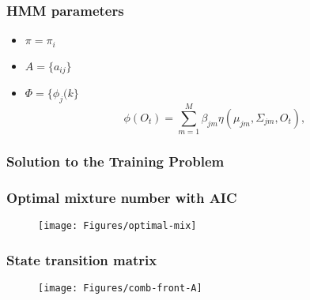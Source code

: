 \documentclass[serif,mathserif]{beamer}
\begin{document}
\begin{frame}
	\frametitle{HMM parameters}
	\begin{itemize}
		\item \(\pi = {\pi_i}\) \pause 	 %
		\newline
		\newline
		\item \(A =  \{a_{ij} \}\) \pause%
		\newline
		\newline
		\item \(\Phi =   \{ \phi_{j}(k\}\) \pause%
		\begin{equation*}
		\phi(O_t) = \sum_{m=1}^M \beta_{jm} \eta(\mu_{jm}, \Sigma_{jm}, O_t), \label{eq:phi}
		\end{equation*}
	\end{itemize}
\end{frame}

\begin{frame}
	\frametitle{Solution to the Training Problem}
	
\end{frame}

\begin{frame}
	\frametitle{Optimal mixture number with AIC}
	\begin{figure}[t]
		\texttt{[image: Figures/optimal-mix]}
	\end{figure}
\end{frame}

\begin{frame}
	\frametitle{State transition matrix}
		\begin{figure}[t]
		\texttt{[image: Figures/comb-front-A]}
	\end{figure}
\end{frame}
\end{document}
